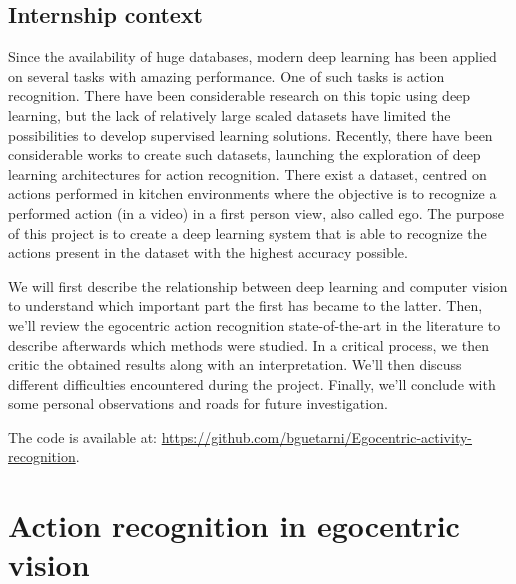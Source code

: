 \documentclass[12pt, a4paper]{report}
\begin{document}
		\section{Internship context}
			Since the availability of huge databases, modern deep learning has been applied on several tasks with amazing performance.
			One of such tasks is action recognition.
			There have been considerable research on this topic using deep learning, but the lack of relatively large scaled datasets have limited the possibilities to develop supervised learning solutions.
			Recently, there have been considerable works to create such datasets, launching the exploration of deep learning architectures for action recognition.
			There exist a dataset, centred on actions performed in kitchen environments where the objective is to recognize a performed action (in a video) in a first person view, also called \gls{ego}.
			The purpose of this project is to create a deep learning system that is able to recognize the actions present in the dataset with the highest accuracy possible.
			\par
			\bigbreak
			We will first describe the relationship between deep learning and computer vision to understand which important part the first has became to the latter.
			Then, we'll review the egocentric action recognition state-of-the-art in the literature to describe afterwards which methods were studied.
			In a critical process, we then critic the obtained results along with an interpretation.
			We'll then discuss different difficulties encountered during the project.
			Finally, we'll conclude with some personal observations and roads for future investigation.
			\par
			\bigbreak
			The code is available at: \url{https://github.com/bguetarni/Egocentric-activity-recognition}.
	\chapter{Action recognition in egocentric vision}
\end{document}
